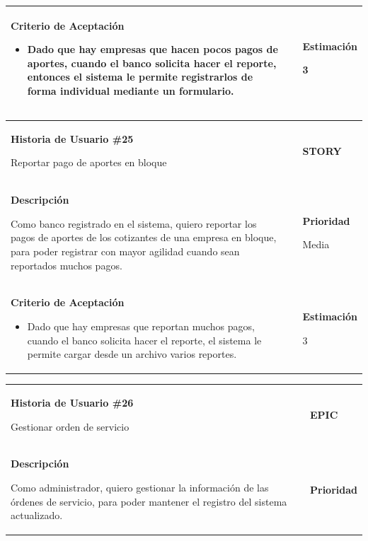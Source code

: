 \documentclass[12pt,a4paper]{article}
\begin{document}
\begin{center}
\begin{tabular}{| p{10cm} c p{2.5cm}|}
\textbf{Criterio de Aceptación}

\begin{itemize}
\item Dado que hay empresas que hacen pocos pagos de aportes, cuando el banco solicita
hacer el reporte, entonces el sistema le permite registrarlos de forma individual
mediante un formulario.
\end{itemize} & & \textbf{Estimación}

3 \\ 
\hline 
\end{tabular}
\vspace{5mm}

\begin{tabular}{| p{10cm} c p{2.5cm}|}
\hline 
\textbf{Historia de Usuario \#25}

Reportar pago de aportes en bloque & & \textbf{{\Large STORY}} \\ 
\textbf{Descripción}

Como banco registrado en el sistema, quiero reportar los pagos de aportes
de los cotizantes de una empresa en bloque, para poder registrar con mayor
agilidad cuando sean reportados muchos pagos. &  & \textbf{Prioridad}

Media\\

\textbf{Criterio de Aceptación}

\begin{itemize}
\item Dado que hay empresas que reportan muchos pagos, cuando el banco solicita
hacer el reporte, el sistema le permite cargar desde un archivo varios reportes.
\end{itemize} & & \textbf{Estimación}

3 \\ 
\hline 
\end{tabular}
\vspace{5mm}

\begin{tabular}{|>{\columncolor[RGB]{215, 215, 215}} p{10cm} >{\columncolor[RGB]{215, 215, 215}} c >{\columncolor[RGB]{215, 215, 215}} p{2.5cm}|}
\hline 
\textbf{Historia de Usuario \#26}

Gestionar orden de servicio & & \textbf{{\Large EPIC}} \\ 
\textbf{Descripción}


Como administrador, quiero gestionar la información de las órdenes de servicio,
para poder mantener el registro del sistema actualizado. &  & \textbf{Prioridad}


\end{tabular}
\end{center}
\end{document}
